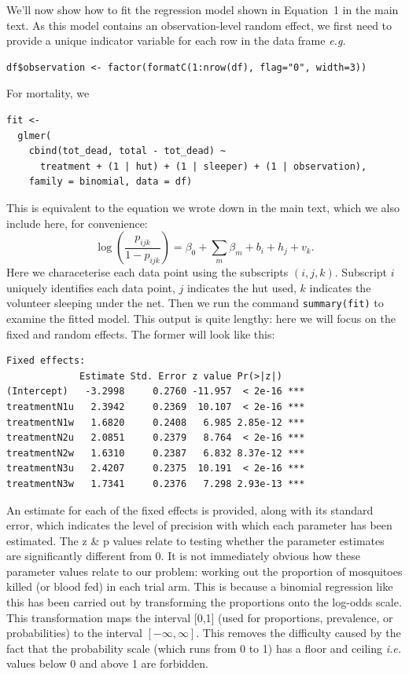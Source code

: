 \documentclass[11pt]{article}
\begin{document}
We'll now show how to fit the regression model shown in Equation~1 in the main text. As this model contains an observation-level random effect, we first need to provide a unique indicator variable for each row in the data frame \textit{e.g.}
\begin{verbatim} 
df$observation <- factor(formatC(1:nrow(df), flag="0", width=3)) 
\end{verbatim}%
For mortality, we
\begin{verbatim} 
fit <-
  glmer(
    cbind(tot_dead, total - tot_dead) ~
      treatment + (1 | hut) + (1 | sleeper) + (1 | observation),
    family = binomial, data = df)
\end{verbatim} 
This is equivalent to the equation we wrote down in the main text, which we also include here, for convenience:
\begin{equation}
\log \left( \frac{p_{ijk}}{1-p_{ijk}} \right) = \beta_0 + \sum_{m}\beta_m + b_i + h_j + v_k.
\end{equation}
Here we characeterise each data point using the subscripts $(i,j,k)$. Subscript $i$ uniquely identifies each data point, $j$ indicates the hut used, $k$ indicates the volunteer sleeping under the net.
Then we run the command \verb+summary(fit)+ to examine the fitted model. This output is quite lengthy: here we will focus on the fixed and random effects. The former will look like this:
\begin{verbatim} 
Fixed effects:
             Estimate Std. Error z value Pr(>|z|)    
(Intercept)   -3.2998     0.2760 -11.957  < 2e-16 ***
treatmentN1u   2.3942     0.2369  10.107  < 2e-16 ***
treatmentN1w   1.6820     0.2408   6.985 2.85e-12 ***
treatmentN2u   2.0851     0.2379   8.764  < 2e-16 ***
treatmentN2w   1.6310     0.2387   6.832 8.37e-12 ***
treatmentN3u   2.4207     0.2375  10.191  < 2e-16 ***
treatmentN3w   1.7341     0.2376   7.298 2.93e-13 ***
\end{verbatim} 
An estimate for each of the fixed effects is provided, along with its standard error, which indicates the level of precision with which each parameter has been estimated. The z \& p values relate to testing whether the parameter estimates are significantly different from 0. It is not immediately obvious how these parameter values relate to our problem: working out the proportion of mosquitoes killed (or blood fed) in each trial arm. This is because a binomial regression like this has been carried out by transforming the proportions onto the log-odds scale. This transformation maps the interval [0,1] (used for proportions, prevalence, or probabilities) to the interval $[-\infty, \infty]$. This removes the difficulty caused by the fact that the probability scale (which runs from 0 to 1) has a floor and ceiling \textit{i.e.} values below 0 and above 1 are forbidden.
\end{document}

